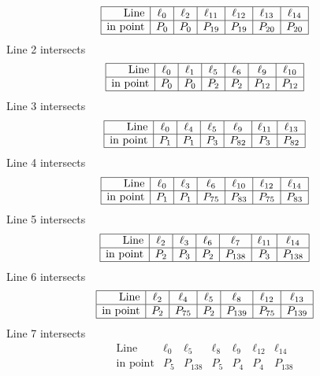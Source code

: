 \documentclass{article}
\begin{document}
{$$\begin{array}{|r*{6}{|c}|}
\hline
\mbox{Line}  & \ell_{0} & \ell_{2} & \ell_{11} & \ell_{12} & \ell_{13} & \ell_{14}\\
\hline
\mbox{in point}  & P_{0} & P_{0} & P_{19} & P_{19} & P_{20} & P_{20}\\
\hline
\end{array}
$$
Line 2 intersects 
$$
\begin{array}{|r*{6}{|c}|}
\hline
\mbox{Line}  & \ell_{0} & \ell_{1} & \ell_{5} & \ell_{6} & \ell_{9} & \ell_{10}\\
\hline
\mbox{in point}  & P_{0} & P_{0} & P_{2} & P_{2} & P_{12} & P_{12}\\
\hline
\end{array}
$$
Line 3 intersects 
$$
\begin{array}{|r*{6}{|c}|}
\hline
\mbox{Line}  & \ell_{0} & \ell_{4} & \ell_{5} & \ell_{9} & \ell_{11} & \ell_{13}\\
\hline
\mbox{in point}  & P_{1} & P_{1} & P_{3} & P_{82} & P_{3} & P_{82}\\
\hline
\end{array}
$$
Line 4 intersects 
$$
\begin{array}{|r*{6}{|c}|}
\hline
\mbox{Line}  & \ell_{0} & \ell_{3} & \ell_{6} & \ell_{10} & \ell_{12} & \ell_{14}\\
\hline
\mbox{in point}  & P_{1} & P_{1} & P_{75} & P_{83} & P_{75} & P_{83}\\
\hline
\end{array}
$$
Line 5 intersects 
$$
\begin{array}{|r*{6}{|c}|}
\hline
\mbox{Line}  & \ell_{2} & \ell_{3} & \ell_{6} & \ell_{7} & \ell_{11} & \ell_{14}\\
\hline
\mbox{in point}  & P_{2} & P_{3} & P_{2} & P_{138} & P_{3} & P_{138}\\
\hline
\end{array}
$$
Line 6 intersects 
$$
\begin{array}{|r*{6}{|c}|}
\hline
\mbox{Line}  & \ell_{2} & \ell_{4} & \ell_{5} & \ell_{8} & \ell_{12} & \ell_{13}\\
\hline
\mbox{in point}  & P_{2} & P_{75} & P_{2} & P_{139} & P_{75} & P_{139}\\
\hline
\end{array}
$$
Line 7 intersects 
$$
\begin{array}{|r*{6}{|c}|}
\hline
\mbox{Line}  & \ell_{0} & \ell_{5} & \ell_{8} & \ell_{9} & \ell_{12} & \ell_{14}\\
\hline
\mbox{in point}  & P_{5} & P_{138} & P_{5} & P_{4} & P_{4} & P_{138}\\

\end{array}$$}
\end{document}
